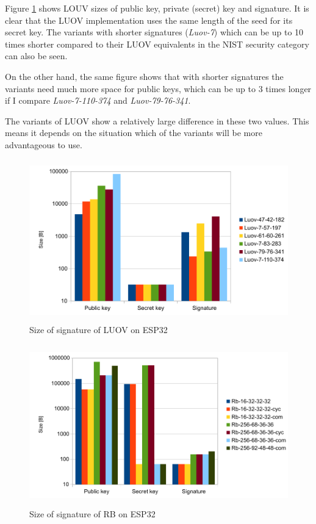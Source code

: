 \documentclass[thesis=M,english]{FITthesis}[2019/12/23]
\begin{document}
\bigskip
\noindent
Figure \ref{sign-luov} shows LOUV sizes of public key, private (secret) key and signature. It is clear that the LUOV implementation uses the same length of the seed for its secret key.  The variants with shorter signatures (\textit{Luov-7}) which can be up to 10 times shorter compared to their LUOV equivalents in the NIST security category can also be seen. 

\bigskip
\noindent
On the other hand, the same figure shows that with shorter signatures the variants need much more space for public keys, which can be up to 3 times longer if I compare \textit{Luov-7-110-374} and \textit{Luov-79-76-341}.

\bigskip
\noindent
The variants of LUOV show a relatively large difference in these two values. This means it depends on the situation which of the variants will be more advantageous to use. 

\begin{figure}[H]
\centering
\includegraphics[width=13cm,height=7cm]{images/sign-luov.pdf}
\caption{Size of signature of LUOV on ESP32}
\label{sign-luov}
\end{figure}

\begin{figure}[H]
\centering
\includegraphics[width=13cm,height=7cm]{images/sign-rb.pdf}
\caption{Size of signature of RB on ESP32}
\label{sign-rb}
\end{figure}
\end{document}
